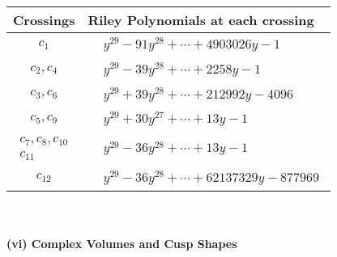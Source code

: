 \documentclass[1p]{elsarticle_modified}
\theoremstyle{definition}
\begin{document}
\begin{tabular}{m{50pt}|m{274pt}}
Crossings & \hspace{64pt}Riley Polynomials at each crossing \\
\hline $$\begin{aligned}c_{1}\end{aligned}$$&$\begin{aligned}
&y^{29}-91 y^{28}+\cdots+4903026 y-1
\end{aligned}$\\
\hline $$\begin{aligned}c_{2},c_{4}\end{aligned}$$&$\begin{aligned}
&y^{29}-39 y^{28}+\cdots+2258 y-1
\end{aligned}$\\
\hline $$\begin{aligned}c_{3},c_{6}\end{aligned}$$&$\begin{aligned}
&y^{29}+39 y^{28}+\cdots+212992 y-4096
\end{aligned}$\\
\hline $$\begin{aligned}c_{5},c_{9}\end{aligned}$$&$\begin{aligned}
&y^{29}+30 y^{27}+\cdots+13 y-1
\end{aligned}$\\
\hline $$\begin{aligned}c_{7},c_{8},c_{10}\\c_{11}\end{aligned}$$&$\begin{aligned}
&y^{29}-36 y^{28}+\cdots+13 y-1
\end{aligned}$\\
\hline $$\begin{aligned}c_{12}\end{aligned}$$&$\begin{aligned}
&y^{29}-36 y^{28}+\cdots+62137329 y-877969
\end{aligned}$\\
\hline
\end{tabular}\\~\\
\newpage\flushleft \textbf{(vi) Complex Volumes and Cusp Shapes}
\end{document}
